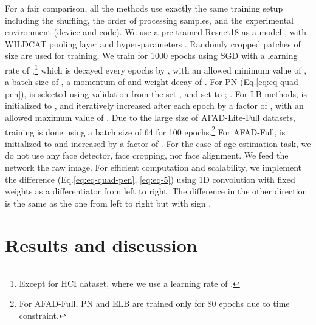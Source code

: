 \documentclass[8pt]{article}
\theoremstyle{definition}
\begin{document}
For a fair comparison, all the methods use exactly the same training setup including the shuffling, the order of processing samples, and the experimental environment (device and code). We use a pre-trained Resnet18 \citep{heZRS16} as a model ,  with WILDCAT \citep{durand2017wildcat} pooling layer and  hyper-parameters . Randomly cropped patches of size  are used for training. We train for 1000 epochs using SGD with a learning rate of ,\footnote{Except for HCI dataset, where we use a learning rate of .}  which is decayed every  epochs by , with an allowed minimum value of , a batch size of , a  momentum of  and weight decay of . For PN (Eq.\ref{eq:eq-quad-pen}),  is selected using validation from the set , and set to ; . For LB methods,  is initialized to , and iteratively increased after each epoch by a factor of , with an allowed maximum value of . Due to the large size of AFAD-Lite-Full datasets, training is done using a batch size of 64 for 100 epochs.\footnote{For AFAD-Full, PN and ELB are trained only for 80 epochs due to time constraint.} For AFAD-Full,  is initialized to  and increased by a factor of . For the case of age estimation task, we do not use any face detector, face cropping, nor face alignment. We feed the network the raw image. For efficient computation and scalability, we implement the difference  (Eq.\ref{eq:eq-quad-pen}, \ref{eq:eq-5}) using 1D convolution with fixed weights  as a differentiator from left to right. The difference in the other direction is the same as the one from left to right but with sign .









\section{Results and discussion}
\label{sec:results}
\begin{table*}[ht!]
  \caption{Evaluation of different methods over the test sets of ICIAR and HCI datasets (classification datasets).}
  \label{tab:iciar-hci}
  \centering
  \small
\end{table*}
\end{document}
